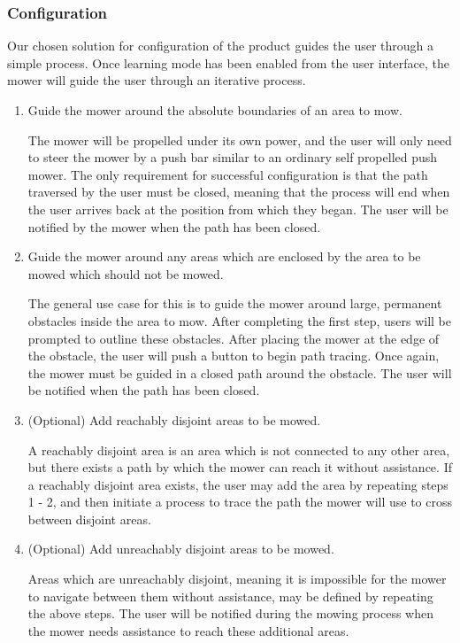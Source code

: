 \documentclass[12pt,letterpaper]{article}
\begin{document}
\subsubsection{Configuration}

Our chosen solution for configuration of the product guides the user through a
simple process.  Once learning mode has been enabled from the user
interface, the mower will guide the user through an iterative process.
\begin{enumerate}
  \item Guide the mower around the absolute boundaries of an area to mow.
  
  		The mower will be propelled under its own power, and the user will only need
  		to steer the mower by a push bar similar to an ordinary self propelled push
  		mower.  The only requirement for successful configuration is that the path
  		traversed by the user must be closed, meaning that the process will end when
  		the user arrives back at the position from which they began.  The user will
  		be notified by the mower when the path has been closed.
  		
  \item Guide the mower around any areas which are enclosed by the area to be
  mowed which should not be mowed.
  
  		The general use case for this is to guide the mower around large, permanent
  		obstacles inside the area to mow.  After completing the first step, users
  		will be prompted to outline these obstacles.  After placing the mower at the
  		edge of the obstacle, the user will push a button to begin path tracing. 
  		Once again, the mower must be guided in a closed path around the obstacle. 
  		The user will be notified when the path has been closed.
  
  \item (Optional) Add reachably disjoint areas to be mowed.
  
        A reachably disjoint area is an area which is not connected to any other area,
        but there exists a path by which the mower can reach it without
        assistance.  If a reachably disjoint area exists, the user
        may add the area by repeating steps 1 - 2, and then initiate a process to trace the path the mower
        will use to cross between disjoint areas.
        
  \item (Optional) Add unreachably disjoint areas to be mowed.
  
        Areas which are unreachably disjoint, meaning it is impossible for the
        mower to navigate between them without assistance, may be defined by
        repeating the above steps. The user will be notified during the mowing
        process when the mower needs assistance to reach these additional areas.
\end{enumerate}
\end{document}
